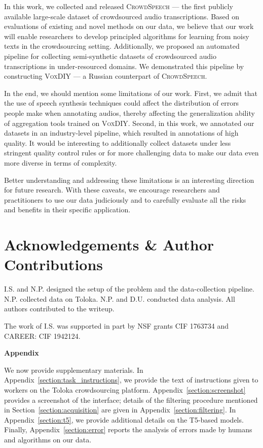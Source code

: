 \documentclass{article}
\newcommand{\speech}{\textsc{CrowdSpeech}}
\newcommand{\vox}{\textsc{VoxDIY}}
\begin{document}
In this work, we collected and released \speech{} --- the first publicly available large-scale dataset of crowdsourced audio transcriptions. Based on evaluations of existing and novel methods on our data, we believe that our work will enable researchers to develop principled algorithms for learning from noisy texts in the crowdsourcing setting. Additionally, we proposed an automated pipeline for collecting semi-synthetic datasets of crowdsourced audio transcriptions in under-resourced domains. We demonstrated this pipeline by constructing \vox{} --- a Russian counterpart of \speech{}.

In the end, we should mention some limitations of our work. First, we admit that the use of speech synthesis techniques could affect the distribution of errors people make when annotating audios, thereby affecting the generalization ability of aggregation tools trained on \vox{}. Second, in this work, we annotated our datasets in an industry-level pipeline, which resulted in annotations of high quality. It would be interesting to additionally collect datasets under less stringent quality control rules or for more challenging data to make our data even more diverse in terms of complexity. 

Better understanding and addressing these limitations is an interesting direction for future research. With these caveats, we encourage researchers and practitioners to use our data judiciously and to carefully evaluate all the risks and benefits in their specific application.

\section*{Acknowledgements \& Author Contributions}

I.S. and N.P. designed the setup of the problem and the data-collection pipeline. N.P. collected data on Toloka. N.P. and D.U. conducted data analysis. All authors contributed to the writeup.

The work of I.S. was supported in part by NSF grants CIF 1763734 and CAREER: CIF 1942124.




\newpage

\appendix

\textbf{\LARGE Appendix}

We now provide supplementary materials. In Appendix~\ref{section:task_instructions}, we provide the text of instructions given to workers on the Toloka crowdsourcing platform. Appendix~\ref{section:screenshot} provides a screenshot of the interface; details of the filtering procedure mentioned in Section~\ref{section:acquisition} are given in Appendix~\ref{section:filtering}. In Appendix~\ref{section:t5}, we provide additional details on the T5-based models. Finally, Appendix~\ref{section:error} reports the analysis of errors made by humans and algorithms on our data. 
\end{document}
